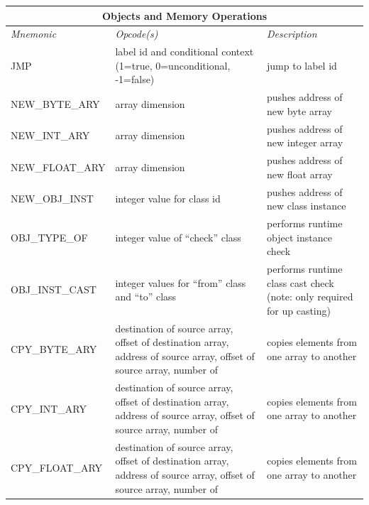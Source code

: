 \documentclass[11pt]{article}
\begin{document}
\begin{center}
\vspace{\baselineskip}
  \begin{tabular}{| l | p{4 cm} | p{6 cm} |}
    \hline
    \multicolumn{3}{|c|}{\textbf{Objects and Memory Operations}} \\
    \hline
    \emph{Mnemonic}  &  \emph{Opcode(s)}  &  \emph{Description} \\ \hline \hline
    JMP & label id and conditional context (1=true, 0=unconditional, -1=false) & jump to label id \\ \hline
    NEW\_BYTE\_ARY & array dimension & pushes address of new byte array \\ \hline
    NEW\_INT\_ARY & array dimension & pushes address of new integer array \\ \hline
    NEW\_FLOAT\_ARY & array dimension & pushes address of new float array \\ \hline
    NEW\_OBJ\_INST & integer value for class id & pushes address of new class instance \\ \hline
    OBJ\_TYPE\_OF & integer value of ``check'' class & performs runtime object instance check \\ \hline
    OBJ\_INST\_CAST & integer values for ``from'' class and ``to''
    class & performs runtime class cast check (note: only required for
    up casting) \\ \hline
    CPY\_BYTE\_ARY & destination of source array, offset of destination array,
    address of source array, offset of source array, number of
    & copies elements from one array to another \\ \hline
    CPY\_INT\_ARY & destination of source array, offset of destination array,
    address of source array, offset of source array, number of
    & copies elements from one array to another \\ \hline
    CPY\_FLOAT\_ARY & destination of source array, offset of destination array,
    address of source array, offset of source array, number of
    & copies elements from one array to another \\ \hline
  \end{tabular}


\end{center}
\end{document}
